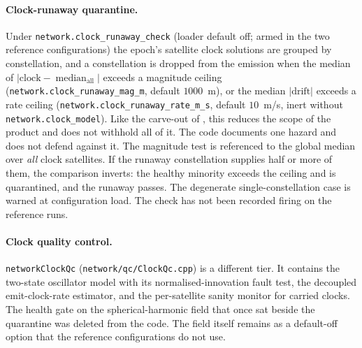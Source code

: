 \documentclass[main.tex]{subfiles}
\begin{document}
\paragraph{Clock-runaway quarantine.}  Under
\texttt{network.clock\_runaway\_check} (loader default off; armed in the two
reference configurations) the epoch's satellite clock
solutions are grouped by constellation, and a constellation is dropped from the
emission when the median of $|\text{clock} - \operatorname{median}_{\mathrm{all}}|$
exceeds a magnitude ceiling (\texttt{network.clock\_runaway\_mag\_m}, default
$1000$~m), or the median $|\text{drift}|$ exceeds a rate ceiling
(\texttt{network.clock\_runaway\_rate\_m\_s}, default $10$~m/s, inert without
\texttt{network.clock\_model}).  Like the carve-out of , this reduces
the scope of the product and does not withhold all of it.  The code
documents one hazard and does not defend against it.  The magnitude test
is referenced to the global median over \emph{all} clock satellites.  If
the runaway constellation supplies half or more of them, the comparison
inverts: the healthy minority exceeds the ceiling and is quarantined,
and the runaway passes.  The degenerate single-constellation case is
warned at configuration load.  The check has not been recorded firing on the
reference runs.

\paragraph{Clock quality control.}
\texttt{networkClockQc} (\texttt{network/qc/ClockQc.cpp}) is a different
tier.  It contains the two-state oscillator model with its
normalised-innovation fault test, the decoupled emit-clock-rate
estimator, and the per-satellite sanity monitor for carried clocks.
The health gate on the spherical-harmonic field that once sat beside the
quarantine was deleted from the code.  The field itself remains as a
default-off option that the reference configurations do not use.

\ifSubfilesClassLoaded{\printbibliography}{}
\end{document}
